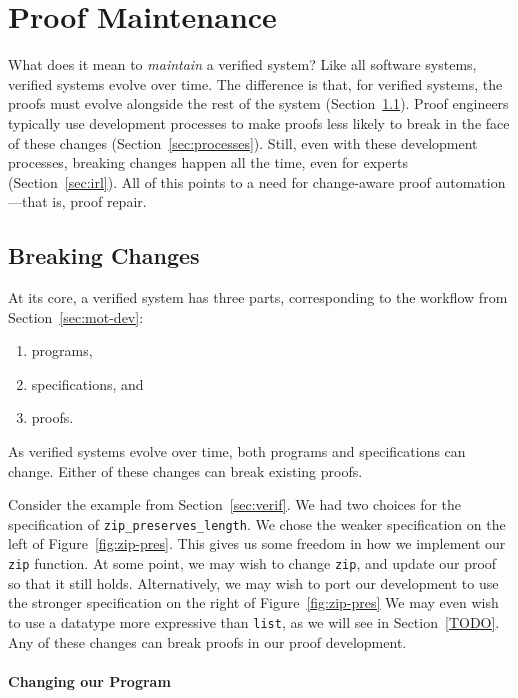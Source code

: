 \section{Proof Maintenance}
\label{sec:mot-mai}

What does it mean to \textit{maintain} a verified system?
Like all software systems, verified systems evolve over time.
The difference is that, for verified systems, the proofs must evolve alongside the rest of the system (Section~\ref{sec:changes}).
Proof engineers typically use development processes to make proofs less likely to break in the face of these changes (Section~\ref{sec:processes}).
Still, even with these development processes, breaking changes happen all the time, even for experts (Section~\ref{sec:irl}).
All of this points to a need for change-aware proof automation---that is, proof repair.

\subsection{Breaking Changes}
\label{sec:changes}

At its core, a verified system has three parts, corresponding to the workflow from Section~\ref{sec:mot-dev}:

\begin{enumerate}
\item programs,
\item specifications, and
\item proofs.
\end{enumerate}
As verified systems evolve over time, both programs and specifications can change.
Either of these changes can break existing proofs.

Consider the example from Section~\ref{sec:verif}.
We had two choices for the specification of \lstinline{zip_preserves_length}.
We chose the weaker specification on the left of Figure~\ref{fig:zip-pres}.
This gives us some freedom in how we implement our \lstinline{zip} function.
At some point, we may wish to change \lstinline{zip}, and update our proof so that it still holds.
Alternatively, we may wish to port our development to use the stronger specification on the right of Figure~\ref{fig:zip-pres}
We may even wish to use a datatype more expressive than \lstinline{list}, as we will see in Section~\ref{TODO}. %
Any of these changes can break proofs in our proof development.

\paragraph{Changing our Program}

